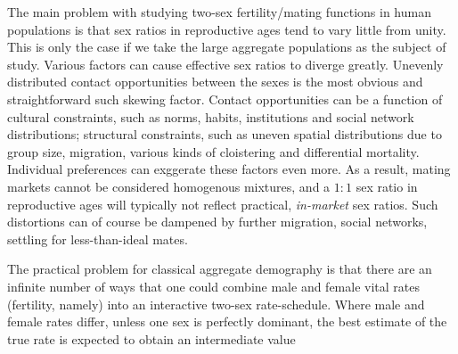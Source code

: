 
The main problem with studying two-sex fertility/mating functions in human
populations is that sex ratios in reproductive ages tend to vary little from
unity. This is only the case if we take the large aggregate populations as the
subject of study. Various factors can cause effective sex ratios to diverge
greatly. Unevenly distributed contact opportunities between the sexes is the
most obvious and straightforward such skewing factor. Contact opportunities can
be a function of cultural constraints, such as norms, habits, institutions and
social network distributions; structural constraints, such as uneven spatial
distributions due to group size, migration, various kinds of cloistering and
differential mortality. Individual preferences can exggerate these factors even 
more. As a result, mating markets cannot be considered homogenous mixtures, and 
a $1:1$ sex ratio in reproductive ages will typically not reflect practical,
\textit{in-market} sex ratios. Such distortions can of course be dampened by
further migration, social networks, settling for less-than-ideal mates.

The practical problem for classical aggregate demography is that there are an
infinite number of ways that one could combine male and female vital rates
(fertility, namely) into an interactive two-sex rate-schedule. Where male and
female rates differ, unless one sex is perfectly dominant, the best estimate of
the true rate is expected to obtain an intermediate value

